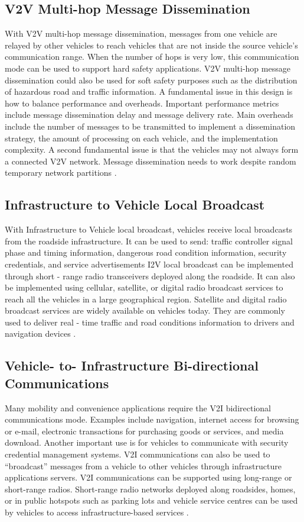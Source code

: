 \documentclass[12pt]{report}
\begin{document}
	\subsection{V2V Multi-hop Message Dissemination}
	With V2V multi-hop message dissemination, messages from one vehicle are relayed by other vehicles to reach vehicles that are not inside the source vehicle’s communication range. When the number of hops is very low, this communication mode can be used to support hard safety applications. V2V multi-hop message dissemination could also be used for soft safety purposes such as the distribution of hazardous road and traffic information.
	A fundamental issue in this design is how to balance performance and overheads. Important performance metrics include message dissemination delay and message delivery rate. Main overheads include the number of messages to be transmitted to implement
	a dissemination strategy, the amount of processing on each vehicle, and the implementation complexity.
	A second fundamental issue is that the vehicles may not always form a connected V2V network. Message dissemination needs to work despite random temporary network partitions \cite{protocols}.
	
	\subsection{Infrastructure to Vehicle Local Broadcast}
	With Infrastructure to Vehicle local broadcast, vehicles receive local broadcasts from the roadside infrastructure. It can be used to send: traffic controller signal phase and timing information,  dangerous road condition information, security credentials, and service advertisements
	I2V local broadcast can be implemented through short - range radio transceivers deployed along the roadside. It can also be implemented using cellular, satellite, or digital radio broadcast services to reach all the vehicles in a large geographical region. Satellite and digital radio broadcast services are widely
	available on vehicles today. They are commonly used to deliver real - time traffic and road conditions information to drivers and navigation devices \cite{protocols}.
	
	\subsection{Vehicle- to- Infrastructure Bi-directional Communications}
	Many mobility and convenience applications require the V2I bidirectional communications mode. Examples include navigation, internet access for browsing or e-mail, electronic transactions for purchasing	goods or services, and media download. Another important use is for vehicles to communicate with security credential
	management systems. V2I communications can also be used to “broadcast”	messages from a vehicle to other vehicles through infrastructure applications	servers.
	V2I communications can be supported using long-range or short-range radios. Short-range radio networks deployed along roadsides, homes, or in public hotspots such as parking lots and vehicle service centres can be used by vehicles to access infrastructure-based services \cite{protocols}.
	
\end{document}
